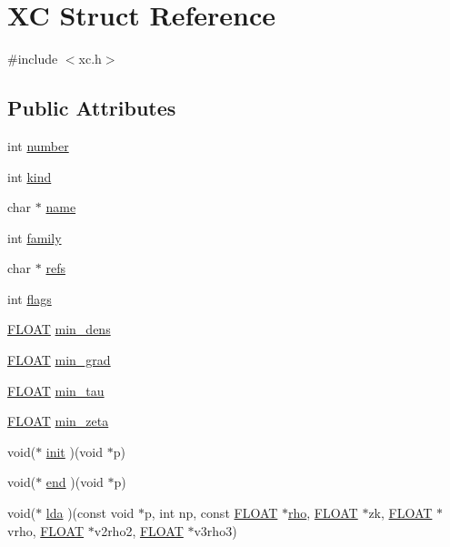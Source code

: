 \hypertarget{struct_x_c}{\section{X\-C Struct Reference}
\label{struct_x_c}
}


{\ttfamily \#include $<$xc.\-h$>$}

\subsection*{Public Attributes}
\begin{DoxyCompactItemize}
\item 
int \hyperlink{struct_x_c_a9fa30a16910fd6d825b9c51534b97ffc}{number}
\item 
int \hyperlink{struct_x_c_a3f5c7fb8208a95684d62df96f5d191be}{kind}
\item 
char $\ast$ \hyperlink{struct_x_c_a82765781700138d6f6c8eb7c915f13c4}{name}
\item 
int \hyperlink{struct_x_c_a19222c78e83fe26357674d70803bb99e}{family}
\item 
char $\ast$ \hyperlink{struct_x_c_a38639f50e2a0bf09dbfe69d869732628}{refs}
\item 
int \hyperlink{struct_x_c_a5e91c2bd0970d21b5b279a616b81d696}{flags}
\item 
\hyperlink{src_2xc__config_8h_ae8690abbffa85934d64d545920e2b108}{F\-L\-O\-A\-T} \hyperlink{struct_x_c_a45690b44b2c673b610f877c441111338}{min\-\_\-dens}
\item 
\hyperlink{src_2xc__config_8h_ae8690abbffa85934d64d545920e2b108}{F\-L\-O\-A\-T} \hyperlink{struct_x_c_aab049f763479029744a763ee093e2f92}{min\-\_\-grad}
\item 
\hyperlink{src_2xc__config_8h_ae8690abbffa85934d64d545920e2b108}{F\-L\-O\-A\-T} \hyperlink{struct_x_c_a618138ac871ab68f515cf4f33955ee00}{min\-\_\-tau}
\item 
\hyperlink{src_2xc__config_8h_ae8690abbffa85934d64d545920e2b108}{F\-L\-O\-A\-T} \hyperlink{struct_x_c_aa9ccdbb1163f44c8a95bfb5529c2afbd}{min\-\_\-zeta}
\item 
void($\ast$ \hyperlink{struct_x_c_a05765744608dd711f4872fcd87db6e77}{init} )(void $\ast$p)
\item 
void($\ast$ \hyperlink{struct_x_c_a3de037ae95b5dc34038931e65bc30156}{end} )(void $\ast$p)
\item 
void($\ast$ \hyperlink{struct_x_c_aa3c3b6074412338afac276b03c238e43}{lda} )(const void $\ast$p, int np, const \hyperlink{src_2xc__config_8h_ae8690abbffa85934d64d545920e2b108}{F\-L\-O\-A\-T} $\ast$\hyperlink{md_8h_a52b35cee8a5db846ce98f4904e1c8b13}{rho}, \hyperlink{src_2xc__config_8h_ae8690abbffa85934d64d545920e2b108}{F\-L\-O\-A\-T} $\ast$zk, \hyperlink{src_2xc__config_8h_ae8690abbffa85934d64d545920e2b108}{F\-L\-O\-A\-T} $\ast$vrho, \hyperlink{src_2xc__config_8h_ae8690abbffa85934d64d545920e2b108}{F\-L\-O\-A\-T} $\ast$v2rho2, \hyperlink{src_2xc__config_8h_ae8690abbffa85934d64d545920e2b108}{F\-L\-O\-A\-T} $\ast$v3rho3)

\end{DoxyCompactItemize}
